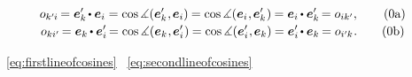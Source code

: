 \nopagebreak\vspace{-0.2em}\en{\vspace{-0.3em}}
\begin{gather*}
\cosinematrix{k'\hspace{-0.1ex}i} \hspace{-0.2ex}
= \bm{e}'_{k} \hspace{-0.2ex} \dotp \bm{e}_i
= \operatorname{cos} \measuredangle (
    \bm{e}'_{k}
    \hspace{.1ex} , \hspace{-0.1ex}
    \bm{e}_i
) \hspace{-0.1ex}
= \operatorname{cos} \measuredangle (
    \bm{e}_{i}
    \hspace{.1ex} , \hspace{-0.1ex}
    \bm{e}'_{k}
\hspace{.1ex}) \hspace{-0.1ex}
= \bm{e}_{i} \hspace{-0.15ex} \dotp \bm{e}'_k \hspace{-0.25ex}
= \cosinematrix{ik'} ,
\tag{\theequation a}\label{eq:firstlineofcosines}
\\[-0.1em]
%
\cosinematrix{ki'} \hspace{-0.25ex}
= \bm{e}_k \hspace{-0.15ex} \dotp \bm{e}'_{i} \hspace{-0.25ex}
= \operatorname{cos} \measuredangle (
    \bm{e}_k
    \hspace{.1ex} , \hspace{-0.1ex}
    \bm{e}'_{i}
\hspace{.1ex} ) \hspace{-0.1ex}
= \operatorname{cos} \measuredangle (
    \bm{e}'_{i}
    \hspace{.1ex} , \hspace{-0.1ex}
    \bm{e}_k
) \hspace{-0.1ex}
= \bm{e}'_{i} \hspace{-0.2ex} \dotp \bm{e}_k \hspace{-0.2ex}
= \cosinematrix{i'\hspace{-0.1ex}k}
\hspace{.1ex} .
\tag{\theequation b}\label{eq:secondlineofcosines}
\end{gather*}

\noindent
{}~\eqref{eq:firstlineofcosines}
~\eqref{eq:secondlineofcosines}

